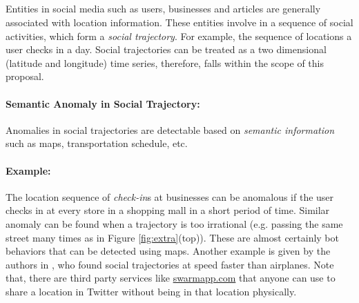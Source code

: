 %

\subsection{\Ttwothree}

Entities in social media such as users, businesses and articles are generally associated with location information. These entities involve in a sequence of social activities, which form a {\it social trajectory}. For example, the sequence of locations a user checks in a day. Social trajectories can be treated as a two dimensional (latitude and longitude) time series, therefore, falls within the scope of this proposal.
\paragraph{Semantic Anomaly in Social Trajectory:} Anomalies in social trajectories are detectable based on {\it semantic information} such as maps, transportation schedule, etc.
\paragraph{Example:} The location sequence of {\it check-in}s at businesses can be anomalous if the user checks in at every store in a shopping mall in a short period of time. Similar anomaly can be found when a trajectory is too irrational (e.g. passing the same street many times as in Figure \ref{fig:extra}(top)). These are almost certainly bot behaviors that can be detected using maps. Another example is given by the authors in \cite{Gionis2014}, who found social trajectories at speed faster than airplanes. Note that, there are third party services like \url{swarmapp.com} that anyone can use to share a location in Twitter without being in that location physically.




